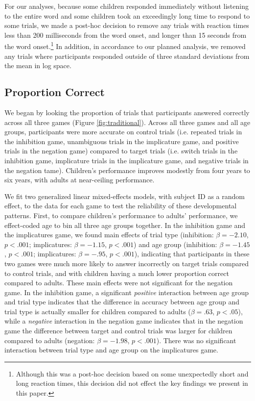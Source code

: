 \documentclass[10pt,letterpaper]{article}
\begin{document}
For our analyses, because some children responded immediately without listening to the entire word and some children took an exceedingly long time to respond to some trials, we made a post-hoc decision to remove any trials with reaction times less than 200 milliseconds from the word onset, and longer than 15 seconds from the word onset.\footnote{Although this was a post-hoc decision based on some unexpectedly short and long reaction times, this decision did not effect the key findings we present in this paper.}  In addition, in accordance to our planned analysis, we removed any trials where participants responded outside of three standard deviations from the mean in log space.

\subsection{Proportion Correct}

We began by looking the proportion of trials that participants answered correctly across all three games (Figure \ref{fig:traditional}).  Across all three games and all age groups, participants were more accurate on control trials (i.e. repeated trials in the inhibition game, unambiguous trials in the implicature game, and positive trials in the negation game) compared to target trials (i.e. switch trials in the inhibition game, implicature trials in the implicature game, and negative trials in the negation tame). Children's performance improves modestly from four years to six years, with adults at near-ceiling performance.  

We fit two generalized linear mixed-effects models, with subject ID as a random effect, to the data for each game to test the reliability of these developmental patterns.  First, to compare children's performance to adults' performance, we effect-coded age to bin all three age groups together.  In the inhibition game and the implicatures game, we found main effects of trial type (inhibition: $\beta = -2.10$, $p< .001$; implicatures: $\beta = -1.15$, $p< .001$) and age group (inhibition: $\beta = -1.45$, $p< .001$; implicatures: $\beta = -.95$, $p< .001$), indicating that participants in these two games were much more likely to answer incorrectly on target trials compared to control trials, and with children having a much lower proportion correct compared to adults. These main effects were not significant for the negation game.  In the inhibition game, a significant \emph{positive} interaction between age group and trial type indicates that the difference in accuracy between age group and trial type is actually smaller for children compared to adults ($\beta = .63$, $p< .05$), while a \emph{negative} interaction in the negation game indicates that in the negation game the difference between target and control trials was larger for children compared to adults (negation: $\beta = -1.98$, $p< .001$).  There was no significant interaction between trial type and age group on the implicatures game.  
\end{document}
